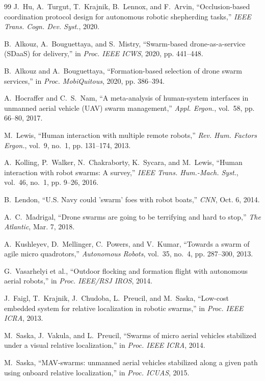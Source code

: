 \documentclass[journal,compsoc]{IEEEtran}
\begin{document}
\begin{thebibliography}{99}
J.~Hu, A.~Turgut, T.~Krajnik, B.~Lennox, and F.~Arvin, ``Occlusion-based coordination protocol design for autonomous robotic shepherding tasks,'' \emph{IEEE Trans. Cogn. Dev. Syst.}, 2020.

B.~Alkouz, A.~Bouguettaya, and S.~Mistry, ``Swarm-based drone-as-a-service ({SDaaS}) for delivery,'' in \emph{Proc. IEEE ICWS}, 2020, pp. 441--448.

B.~Alkouz and A.~Bouguettaya, ``Formation-based selection of drone swarm services,'' in \emph{Proc. MobiQuitous}, 2020, pp. 386--394.

A.~Hocraffer and C.~S.~Nam, ``A meta-analysis of human-system interfaces in unmanned aerial vehicle ({UAV}) swarm management,'' \emph{Appl. Ergon.}, vol.~58, pp. 66--80, 2017.

M.~Lewis, ``Human interaction with multiple remote robots,'' \emph{Rev. Hum. Factors Ergon.}, vol.~9, no.~1, pp. 131--174, 2013.

A.~Kolling, P.~Walker, N.~Chakraborty, K.~Sycara, and M.~Lewis, ``Human interaction with robot swarms: A survey,'' \emph{IEEE Trans. Hum.-Mach. Syst.}, vol.~46, no.~1, pp. 9--26, 2016.

B.~Lendon, ``{U.S.} Navy could 'swarm' foes with robot boats,'' \emph{CNN}, Oct. 6, 2014.

A.~C.~Madrigal, ``Drone swarms are going to be terrifying and hard to stop,'' \emph{The Atlantic}, Mar. 7, 2018.

A.~Kushleyev, D.~Mellinger, C.~Powers, and V.~Kumar, ``Towards a swarm of agile micro quadrotors,'' \emph{Autonomous Robots}, vol.~35, no.~4, pp. 287--300, 2013.

G.~Vasarhelyi et al., ``Outdoor flocking and formation flight with autonomous aerial robots,'' in \emph{Proc. IEEE/RSJ IROS}, 2014.

J.~Faigl, T.~Krajnik, J.~Chudoba, L.~Preucil, and M.~Saska, ``Low-cost embedded system for relative localization in robotic swarms,'' in \emph{Proc. IEEE ICRA}, 2013.

M.~Saska, J.~Vakula, and L.~Preucil, ``Swarms of micro aerial vehicles stabilized under a visual relative localization,'' in \emph{Proc. IEEE ICRA}, 2014.

M.~Saska, ``{MAV}-swarms: unmanned aerial vehicles stabilized along a given path using onboard relative localization,'' in \emph{Proc. ICUAS}, 2015.


\end{thebibliography}
\end{document}
